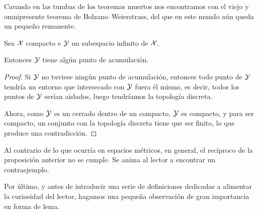 Cavando en las tumbas de los teoremas muertos nos encontramos con el viejo y omnipresente teorema de Bolzano--Weierstrass, del que en este mundo aún queda un pequeño remanente.

\begin{prop}
		Sea $\mathcal{X}$ compacto e $\mathcal{Y}$ un subespacio infinito de $\mathcal{X}$.
		
		Entonces $\mathcal{Y}$ tiene algún punto de acumulación.
\end{prop}
\begin{proof}
	Si $\mathcal{Y}$ no tuviese ningún punto de acumulación, entonces todo punto de $\mathcal{Y}$ tendría un entorno que intersecado con $\mathcal{Y}$ fuera él mismo, es decir, todos los puntos de $\mathcal{Y}$ serían aislados, luego tendríamos la topología discreta.
	
	Ahora, como $\mathcal{Y}$ es un cerrado dentro de un compacto, $\mathcal{Y}$ es compacto, y para ser compacto, un conjunto con la topología discreta tiene que ser finito, lo que produce una contradicción.
\end{proof}

\begin{obs}[Recíproco]
	Al contrario de lo que ocurría en espacios métricos, en general, el recíproco de la proposición anterior no se cumple. Se anima al lector a encontrar un contraejemplo.
\end{obs}

Por último, y antes de introducir una serie de definiciones dedicadas a alimentar la curiosidad del lector, hagamos una pequeña observación de gran importancia en forma de lema.

